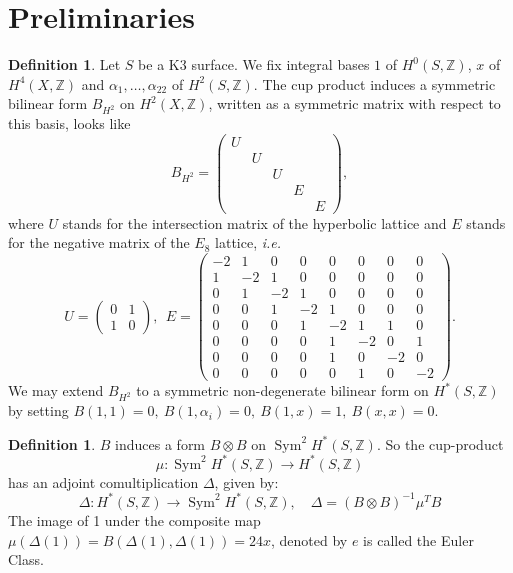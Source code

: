 \documentclass{amsart}
\DeclareMathOperator{\Sym}{Sym}
\newcommand{\ie}{{\it i.e. }}
\newcommand{\IZ}{\mathbb{Z}}
\theoremstyle{plain}
\theoremstyle{definition}
\newtheorem{definition}[theorem]{Definition}
\theoremstyle{remark}
\begin{document}
\section{Preliminaries}
\begin{definition}
Let $S$ be a K3 surface. We fix integral bases $1$ of $H^0(S,\IZ)$, $x$ of $H^4(X,\IZ)$ and $\alpha_1,\ldots ,\alpha_{22}$ of $H^2(S,\IZ)$. The cup product induces a symmetric bilinear form $B_{H^2}$ on $H^2(X,\IZ)$, written as a symmetric matrix with respect to this basis, looks like
$$ B_{H^2} =
\left(\begin{array}{ccccc}
U&&&& \\
&U&&& \\
&&U&& \\
&&&E& \\
&&&&E \end{array}\right),
$$
where $U$ stands for the intersection matrix of the hyperbolic lattice and $E$ stands for the negative matrix of the $E_8$ lattice, \ie 
\begin{equation*}
U = 
\left(\begin{array}{cc}
0&1\\1&0 \end{array}\right),
\ \ E = \left(\begin{array}{cccccccc}
-2&1&0&0&0&0&0&0\\1&-2&1&0&0&0&0&0\\0&1&-2&1&0&0&0&0\\0&0&1&-2&1&0&0&0\\0&0&0&1&-2&1&1&0\\0&0&0&0&1&-2&0&1\\0&0&0&0&1&0&-2&0\\0&0&0&0&0&1&0&-2
\end{array}\right).
\end{equation*}
We may extend $B_{H^2}$ to a symmetric non-degenerate bilinear form on $H^\ast(S,\IZ)$ by setting $ B(1,1) = 0,\ B(1,\alpha_i) = 0,\ B(1,x) = 1, \ B(x,x) = 0$.
\end{definition}
\begin{definition}
$B$ induces a form $B\otimes B$ on $\Sym^2H^\ast(S,\IZ)$. So the cup-product 
\begin{equation*}
\mu : \Sym ^2H^{*}(S,\IZ) \longrightarrow H^\ast(S,\IZ) 
\end{equation*}
has an adjoint comultiplication $\Delta$, given by:
\begin{equation*}
\Delta : H^\ast(S,\IZ) \longrightarrow \Sym^2H^\ast(S,\IZ),\quad \Delta = (B\otimes B)^{-1}\mu^TB
\end{equation*}
The image of 1 under the composite map $\mu(\Delta(1)) = B(\Delta(1),\Delta(1)) = 24 x$, denoted by $e$ is called the Euler Class.
\end{definition}
\end{document}
